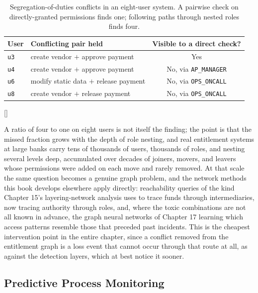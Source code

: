 \documentclass[../ai_in_finance]{subfiles}
\begin{document}
\begin{table}[htbp]
\centering
\begin{lrbox}{\bookmeasuredbox}
\begin{tabular}{llc}
\toprule
User & Conflicting pair held & Visible to a direct check? \\
\midrule
\texttt{u3} & create vendor $+$ approve payment & Yes \\
\texttt{u4} & create vendor $+$ approve payment & No, via \texttt{AP\_MANAGER} \\
\texttt{u6} & modify static data $+$ release payment & No, via \texttt{OPS\_ONCALL} \\
\texttt{u8} & create vendor $+$ release payment & No, via \texttt{OPS\_ONCALL} \\
\bottomrule
\end{tabular}
\end{lrbox}
\ifdim\wd\bookmeasuredbox<0.65\linewidth
\setlength{\bookcapwidth}{0.65\linewidth}
\else
\setlength{\bookcapwidth}{\wd\bookmeasuredbox}
\fi
{}[\bookcapwidth]{
\usebox{\bookmeasuredbox}
}{
\caption{Segregation-of-duties conflicts in an eight-user system. A pairwise check on directly-granted permissions finds one; following paths through nested roles finds four.}
\label{tab:oprisk-sod}
}
\end{table}

A ratio of four to one on eight users is not itself the finding; the point is that the missed fraction grows with the depth of role nesting, and real entitlement systems at large banks carry tens of thousands of users, thousands of roles, and nesting several levels deep, accumulated over decades of joiners, movers, and leavers whose permissions were added on each move and rarely removed. At that scale the same question becomes a genuine graph problem, and the network methods this book develops elsewhere apply directly: reachability queries of the kind Chapter 15's layering-network analysis uses to trace funds through intermediaries, now tracing authority through roles, and, where the toxic combinations are not all known in advance, the graph neural networks of Chapter 17 learning which access patterns resemble those that preceded past incidents. This is the cheapest intervention point in the entire chapter, since a conflict removed from the entitlement graph is a loss event that cannot occur through that route at all, as against the detection layers, which at best notice it sooner.

\subsection{Predictive Process Monitoring}
\label{sec:oprisk-predictive-process}
\end{document}
